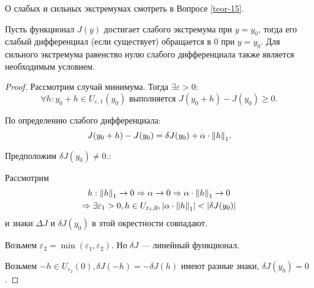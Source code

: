 
О слабых и сильных экстремумах смотреть в Вопросе \ref{teor-15}. 

\begin{theorem}
	Пусть функционал $J(y)$ достигает слабого экстремума при $y = y_0$, тогда его слабый дифференциал (если существует) обращается в 0 при $y = y_0$. Для сильного экстремума равенство нулю слабого дифференциала также является необходимым условием. 
\end{theorem}
\begin{proof}
	Рассмотрим случай минимума. Тогда $\exists \varepsilon > 0$:
	\begin{equation*}
		\forall h : y_0 + h \in U_{\varepsilon, 1}(y_0) \text{ выполняется } J(y_0 + h) - J(y_0) \geqslant 0.
	\end{equation*}
	
	По определению слабого дифференциала: 
	\begin{equation*}
		J(y_0 + h) - J(y_0) = \delta J(y_0) + \alpha \cdot \norm{h}_1.
	\end{equation*}
	
	Предположим $\delta J(y_0) \not = 0$.:
	
	Рассмотрим
	\begin{gather*}
		h : \norm{h}_1 \to 0 \Rightarrow \alpha \to 0 \Rightarrow \alpha \cdot \norm{h}_1 \to 0 \\
		\Rightarrow \exists \varepsilon_1 > 0, h \in U_{\varepsilon_1, 0}, \abs{\alpha \cdot \norm{h}_1} < \abs{\delta J(y_0)}
	\end{gather*} 
	и знаки $\Delta J$ и $\delta J(y_0)$ в этой окрестности совпадают.
	
	Возьмем $\varepsilon_2 = \min(\varepsilon_1, \varepsilon_2)$. Но $\delta J$ --- линейный функционал.
	
	Возьмем $-h \in U_{\varepsilon_2}(0), \delta J(-h) = - \delta J(h)$ имеют разные знаки, $\delta J(y_0) = 0$.
\end{proof}